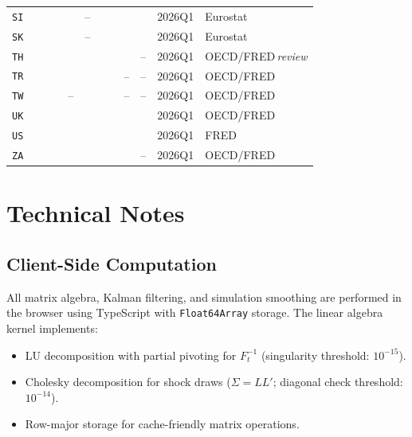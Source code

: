 \documentclass[11pt]{article}
\newcommand{\cmark}{{\color{green!55!black}\checkmark}}
\theoremstyle{definition}
\theoremstyle{remark}
\begin{document}
\begin{landscape}
{\begin{longtable}{@{}l ccccccccc l l@{}}
\texttt{SI} & \cmark & \cmark & \cmark & \cmark & -- & \cmark & \cmark & \cmark & \cmark & 2026Q1 & Eurostat \\
\texttt{SK} & \cmark & \cmark & \cmark & \cmark & -- & \cmark & \cmark & \cmark & \cmark & 2026Q1 & Eurostat \\
\texttt{TH} & \cmark & \cmark & \cmark & \cmark & \cmark & \cmark & \cmark & \cmark & -- & 2026Q1 & OECD/FRED\,\footnotesize\textit{review} \\
\texttt{TR} & \cmark & \cmark & \cmark & \cmark & \cmark & \cmark & \cmark & -- & -- & 2026Q1 & OECD/FRED \\
\texttt{TW} & \cmark & \cmark & \cmark & -- & \cmark & \cmark & \cmark & -- & -- & 2026Q1 & OECD/FRED \\
\texttt{UK} & \cmark & \cmark & \cmark & \cmark & \cmark & \cmark & \cmark & \cmark & \cmark & 2026Q1 & OECD/FRED \\
\texttt{US} & \cmark & \cmark & \cmark & \cmark & \cmark & \cmark & \cmark & \cmark & \cmark & 2026Q1 & FRED \\
\texttt{ZA} & \cmark & \cmark & \cmark & \cmark & \cmark & \cmark & \cmark & \cmark & -- & 2026Q1 & OECD/FRED \\
\end{longtable}
}
\end{landscape}


\section{Technical Notes}\label{sec:technical}

\subsection{Client-Side Computation}

All matrix algebra, Kalman filtering, and simulation smoothing are
performed in the browser using TypeScript with \texttt{Float64Array}
storage.  The linear algebra kernel implements:
\begin{itemize}
  \item LU decomposition with partial pivoting for
    $F_t^{-1}$ (singularity threshold: $10^{-15}$).
  \item Cholesky decomposition for shock draws
    ($\Sigma = LL'$; diagonal check threshold: $10^{-14}$).
  \item Row-major storage for cache-friendly matrix operations.
\end{itemize}
\end{document}
